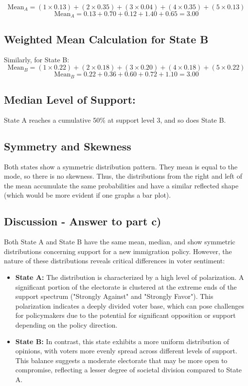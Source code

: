 \documentclass{article}
\begin{document}
\[
\text{Mean}_A = (1 \times 0.13) + (2 \times 0.35) + (3 \times 0.04) + (4 \times 0.35) + (5 \times 0.13)
\]
\[
\text{Mean}_A = 0.13 + 0.70 + 0.12 + 1.40 + 0.65 = 3.00
\]

\subsection*{Weighted Mean Calculation for State B}

Similarly, for State B:
\[
\text{Mean}_B = (1 \times 0.22) + (2 \times 0.18) + (3 \times 0.20) + (4 \times 0.18) + (5 \times 0.22)
\]
\[
\text{Mean}_B = 0.22 + 0.36 + 0.60 + 0.72 + 1.10 = 3.00
\]

\subsection*{Median Level of Support:}

State A reaches a cumulative 50\% at support level 3, and so does State B.

\subsection*{Symmetry and Skewness}

Both states show a symmetric distribution pattern. They mean is equal to the mode, so there is no skewness. Thus, the distributions from the right and left of the mean accumulate the same probabilities and have a similar reflected shape (which would be more evident if one graphs a bar plot).

\subsection*{Discussion - Answer to part c)}

Both State A and State B have the same mean, median, and show symmetric distributions concerning support for a new immigration policy. However, the nature of these distributions reveals critical differences in voter sentiment:

\begin{itemize}
    \item \textbf{State A:} The distribution is characterized by a high level of polarization. A significant portion of the electorate is clustered at the extreme ends of the support spectrum ("Strongly Against" and "Strongly Favor"). This polarization indicates a deeply divided voter base, which can pose challenges for policymakers due to the potential for significant opposition or support depending on the policy direction.

    \item \textbf{State B:} In contrast, this state exhibits a more uniform distribution of opinions, with voters more evenly spread across different levels of support. This balance suggests a moderate electorate that may be more open to compromise, reflecting a lesser degree of societal division compared to State A.
\end{itemize}
\end{document}

